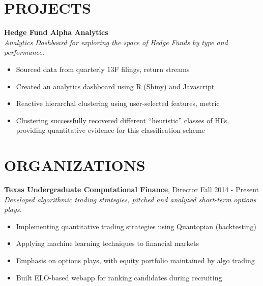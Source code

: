 \documentclass{resume}
\begin{document}
\section{PROJECTS}
\textbf{Hedge Fund Alpha Analytics}\\
\emph{Analytics Dashboard for exploring the space of Hedge Funds by type and performance.}
\begin{itemize}\itemsep-0.3em
\item Sourced data from quarterly 13F filings, return streams
\item Created an analytics dashboard using R (Shiny) and Javascript
\item Reactive hierarchal clustering using user-selected features, metric
\item Clustering successfully recovered  different ``heuristic'' classes of HFs, \\
      \-\hspace{1em} providing quantitative evidence for this classification scheme
\end{itemize}
\vspace{-4pt}                      %

\section{ORGANIZATIONS}
\textbf{Texas Undergraduate Computational Finance}, Director 
  \hfill{\small Fall 2014 - Present}\\
\emph{Developed algorithmic trading strategies, pitched and analyzed short-term options plays.}
\begin{itemize}\itemsep-0.3em
\item Implementing quantitative trading strategies using Quantopian (backtesting)
\item Applying machine learning techniques to financial markets
\item Emphasis on options plays, with equity portfolio maintained by algo trading
\item Built ELO-based webapp for ranking candidates during recruiting
\end{itemize} 
\vspace{-4pt}                      %

\end{document}
